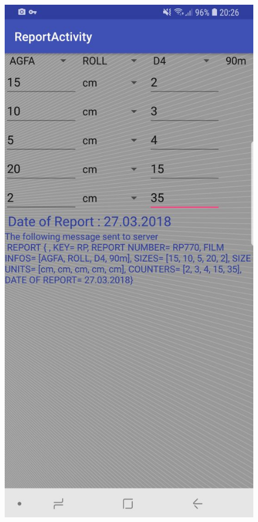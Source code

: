 \begin{figure}[htb]
              \includegraphics[scale=0.2]{img/soft/sendReport.jpeg}

\end{figure}
